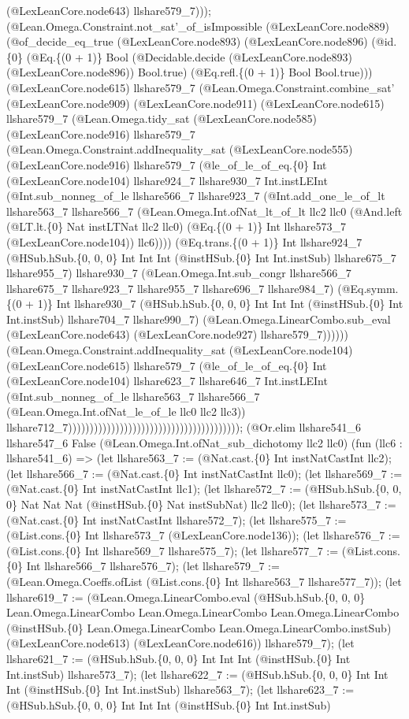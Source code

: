 \documentclass[11pt]{article}
\begin{document}
(@LexLeanCore.node643) llshare579\_7))); (@Lean.Omega.Constraint.not\_sat'\_of\_isImpossible (@LexLeanCore.node889) (@of\_decide\_eq\_true (@LexLeanCore.node893) (@LexLeanCore.node896) (@id.\{0\} (@Eq.\{(0 + 1)\} Bool (@Decidable.decide (@LexLeanCore.node893) (@LexLeanCore.node896)) Bool.true) (@Eq.refl.\{(0 + 1)\} Bool Bool.true))) (@LexLeanCore.node615) llshare579\_7 (@Lean.Omega.Constraint.combine\_sat' (@LexLeanCore.node909) (@LexLeanCore.node911) (@LexLeanCore.node615) llshare579\_7 (@Lean.Omega.tidy\_sat (@LexLeanCore.node585) (@LexLeanCore.node916) llshare579\_7 (@Lean.Omega.Constraint.addInequality\_sat (@LexLeanCore.node555) (@LexLeanCore.node916) llshare579\_7 (@le\_of\_le\_of\_eq.\{0\} Int (@LexLeanCore.node104) llshare924\_7 llshare930\_7 Int.instLEInt (@Int.sub\_nonneg\_of\_le llshare566\_7 llshare923\_7 (@Int.add\_one\_le\_of\_lt llshare563\_7 llshare566\_7 (@Lean.Omega.Int.ofNat\_lt\_of\_lt llc2 llc0 (@And.left (@LT.lt.\{0\} Nat instLTNat llc2 llc0) (@Eq.\{(0 + 1)\} Int llshare573\_7 (@LexLeanCore.node104)) llc6)))) (@Eq.trans.\{(0 + 1)\} Int llshare924\_7 (@HSub.hSub.\{0, 0, 0\} Int Int Int (@instHSub.\{0\} Int Int.instSub) llshare675\_7 llshare955\_7) llshare930\_7 (@Lean.Omega.Int.sub\_congr llshare566\_7 llshare675\_7 llshare923\_7 llshare955\_7 llshare696\_7 llshare984\_7) (@Eq.symm.\{(0 + 1)\} Int llshare930\_7 (@HSub.hSub.\{0, 0, 0\} Int Int Int (@instHSub.\{0\} Int Int.instSub) llshare704\_7 llshare990\_7) (@Lean.Omega.LinearCombo.sub\_eval (@LexLeanCore.node643) (@LexLeanCore.node927) llshare579\_7)))))) (@Lean.Omega.Constraint.addInequality\_sat (@LexLeanCore.node104) (@LexLeanCore.node615) llshare579\_7 (@le\_of\_le\_of\_eq.\{0\} Int (@LexLeanCore.node104) llshare623\_7 llshare646\_7 Int.instLEInt (@Int.sub\_nonneg\_of\_le llshare563\_7 llshare566\_7 (@Lean.Omega.Int.ofNat\_le\_of\_le llc0 llc2 llc3)) llshare712\_7)))))))))))))))))))))))))))))))))))))))); (@Or.elim llshare541\_6 llshare547\_6 False (@Lean.Omega.Int.ofNat\_sub\_dichotomy llc2 llc0) (fun (llc6 : llshare541\_6) => (let llshare563\_7 := (@Nat.cast.\{0\} Int instNatCastInt llc2); (let llshare566\_7 := (@Nat.cast.\{0\} Int instNatCastInt llc0); (let llshare569\_7 := (@Nat.cast.\{0\} Int instNatCastInt llc1); (let llshare572\_7 := (@HSub.hSub.\{0, 0, 0\} Nat Nat Nat (@instHSub.\{0\} Nat instSubNat) llc2 llc0); (let llshare573\_7 := (@Nat.cast.\{0\} Int instNatCastInt llshare572\_7); (let llshare575\_7 := (@List.cons.\{0\} Int llshare573\_7 (@LexLeanCore.node136)); (let llshare576\_7 := (@List.cons.\{0\} Int llshare569\_7 llshare575\_7); (let llshare577\_7 := (@List.cons.\{0\} Int llshare566\_7 llshare576\_7); (let llshare579\_7 := (@Lean.Omega.Coeffs.ofList (@List.cons.\{0\} Int llshare563\_7 llshare577\_7)); (let llshare619\_7 := (@Lean.Omega.LinearCombo.eval (@HSub.hSub.\{0, 0, 0\} Lean.Omega.LinearCombo Lean.Omega.LinearCombo Lean.Omega.LinearCombo (@instHSub.\{0\} Lean.Omega.LinearCombo Lean.Omega.LinearCombo.instSub) (@LexLeanCore.node613) (@LexLeanCore.node616)) llshare579\_7); (let llshare621\_7 := (@HSub.hSub.\{0, 0, 0\} Int Int Int (@instHSub.\{0\} Int Int.instSub) llshare573\_7); (let llshare622\_7 := (@HSub.hSub.\{0, 0, 0\} Int Int Int (@instHSub.\{0\} Int Int.instSub) llshare563\_7); (let llshare623\_7 := (@HSub.hSub.\{0, 0, 0\} Int Int Int (@instHSub.\{0\} Int Int.instSub) 
\end{document}
